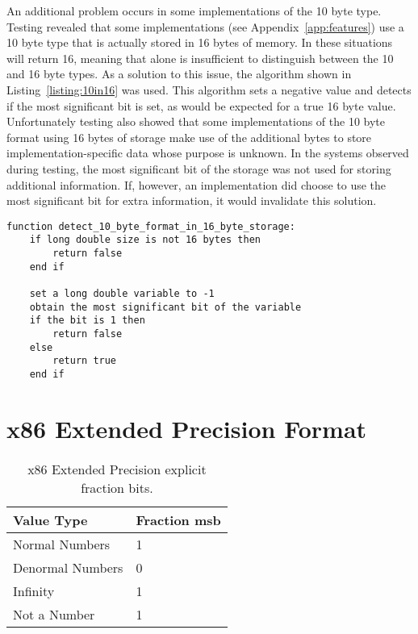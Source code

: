 An additional problem occurs in some implementations of the 10 byte type. Testing revealed that some implementations (see Appendix~\ref{app:features}) use a 10 byte  type that is actually stored in 16 bytes of memory. In these situations  will return 16, meaning that  alone is insufficient to distinguish between the 10 and 16 byte types. As a solution to this issue, the algorithm shown in Listing~\ref{listing:10in16} was used. This algorithm sets a negative  value and detects if the most significant bit is set, as would be expected for a true 16 byte value. Unfortunately testing also showed that some implementations of the 10 byte format using 16 bytes of storage make use of the additional bytes to store implementation-specific data whose purpose is unknown. In the systems observed during testing, the most significant bit of the storage was not used for storing additional information. If, however, an implementation did choose to use the most significant bit for extra information, it would invalidate this solution.

\noindent
\begin{minipage}{\linewidth}
\begin{singlespace}
\begin{lstlisting}[language={}, caption=An algorithm to detect 10 byte values that use 16 bytes of storage., label=listing:10in16]
function detect_10_byte_format_in_16_byte_storage:
    if long double size is not 16 bytes then
        return false
    end if

    set a long double variable to -1
    obtain the most significant bit of the variable
    if the bit is 1 then
        return false
    else
        return true
    end if
\end{lstlisting}
\end{singlespace}
\end{minipage}

\section{x86 Extended Precision Format}
\label{sec:challenges_x86_ext}

\begin{table}
  \centering
  \caption{x86 Extended Precision explicit fraction bits.}
  \label{table:x86_ext_fraction_msb}
  \begin{tabular}{|l|l|}
    \hline
    \textbf{Value Type} & \textbf{Fraction msb} \\
    \hline
    Normal Numbers      & 1                     \\
    \hline
    Denormal Numbers    & 0                     \\
    \hline
    Infinity            & 1                     \\
    \hline
    Not a Number        & 1                     \\
    \hline
  \end{tabular}
\end{table}

